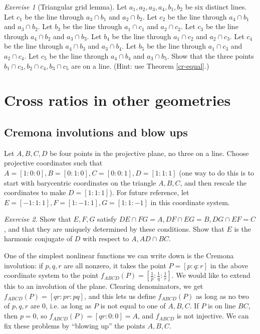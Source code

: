\documentclass[letterpaper,11pt]{article}
\theoremstyle{definition}
\theoremstyle{remark}
\newtheorem{exer}{Exercise}
\begin{document}
\begin{exer}[Triangular grid lemma] Let $a_1,a_2,a_3,a_4,b_1,b_2$ be six distinct lines. Let $c_1$ be the line through $a_3\cap b_1$ and $a_2\cap b_2$. Let $c_2$ be the line through $a_4\cap b_1$ and $a_3\cap b_2$. Let $b_3$ be the line through $a_1\cap c_1$ and $a_2\cap c_2$. Let $c_3$ be the line through $a_4\cap b_2$ and $a_3\cap b_3$. Let $b_4$ be the line through $a_1\cap c_2$ and $a_2\cap c_3$. Let $c_4$ be the line through $a_4\cap b_3$ and $a_3\cap b_4$. Let $b_5$ be the line through $a_1\cap c_3$ and $a_2\cap c_4$. Let $c_5$ be the line through $a_4\cap b_4$ and $a_3\cap b_5$. Show that the three points $b_1\cap c_3, b_2\cap c_4, b_3\cap c_5$ are on a line. (Hint: use Theorem \ref{cr-equal}.)
\end{exer}


\bigskip

\section{Cross ratios in other geometries}

\subsection{Cremona involutions and blow ups}

Let $A,B,C,D$ be four points in the projective plane, no three on a line. Choose projective coordinates such that $A = [1:0:0], B = [0:1:0], C = [0:0:1], D = [1:1:1]$ (one way to do this is to start with barycentric coordinates on the triangle $A,B,C$, and then rescale the coordinates to make $D = [1:1:1]$). For future reference, let $E = [-1:1:1], F = [1:-1:1], G = [1:1:-1]$ in this coordinate system.

\begin{exer} Show that $E,F,G$ satisfy $DE \cap FG = A, DF \cap EG = B, DG \cap EF = C$, and that they are uniquely determined by these conditions. Show that $E$ is the harmonic conjugate of $D$ with respect to $A, AD\cap BC$.
\end{exer}

One of the simplest nonlinear functions we can write down is the Cremona involution: if $p,q,r$ are all nonzero, it takes the point $P = [p:q:r]$ in the above coordinate system to the point $f_{ABCD}(P) = [\frac{1}{p}:\frac{1}{q}:\frac{1}{r}]$. We would like to extend this to an involution of the plane. Clearing denominators, we get $f_{ABCD}(P) = [qr:pr:pq]$, and this lets us define $f_{ABCD}(P)$ as long as no two of $p,q,r$ are $0$, i.e. as long as $P$ is not equal to one of $A,B,C$. If $P$ is on line $BC$, then $p=0$, so $f_{ABCD}(P) = [qr:0:0] = A$, and $f_{ABCD}$ is not injective. We can fix these problems by ``blowing up'' the points $A,B,C$.
\end{document}
